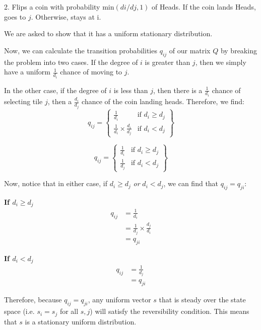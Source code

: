\documentclass{article}
\begin{document}
2. Flips a coin with probability $\text{min}(di/dj, 1)$ of Heads. If the coin lands Heads, goes to $j$. Otherwise, stays at i.

We are asked to show that it has a uniform stationary distribution. 

Now, we can calculate the transition probabilities $q_{ij}$ of our matrix $Q$ by breaking the problem into two cases. If the degree of $i$ is greater than $j$, then we simply have a uniform $\frac{1}{d_{i}}$ chance of moving to $j$.

In the other case, if the degree of $i$ is less than $j$, then there is a $\frac{1}{d_{i}}$ chance of selecting tile $j$, then a $\frac{d_{i}}{d_{j}}$ chance of the coin landing heads. Therefore, we find:
\begin{equation}
q_{ij} =
\left\{
    \begin{array}{lr}
        \frac{1}{d_{i}} & \text{if } d_{i} \geq d_{j}\\
        \frac{1}{d_{i}} \times \frac{d_{i}}{d_{j}} & \text{if } d_{i} < d_{j}
    \end{array}
\right\}
\end{equation}

\begin{equation}
q_{ij} =
\left\{
    \begin{array}{lr}
        \frac{1}{d_{i}} & \text{if } d_{i} \geq d_{j}\\
        \frac{1}{d_{j}} & \text{if } d_{i} < d_{j}
    \end{array}
\right\}
\end{equation}

Now, notice that in either case, if $d_{i} \geq d_{j}$ \textit{or} $d_{i} < d_{j}$, we can find that $q_{ij} = q_{ji}$:

\textbf{If $d_{i} \geq d_{j}$}
\begin{align}
q_{ij} &= \frac{1}{d_{i}} \\
& = \frac{1}{d_{j}} \times \frac{d_{j}}{d_{i}} \\
& = q_{ji}
\end{align}

\textbf{If $d_{i} < d_{j}$}
\begin{align}
q_{ij} &= \frac{1}{d_{j}} \\
& = q_{ji}
\end{align}

Therefore, because $q_{ij} = q_{ji}$, any uniform vector $s$ that is steady over the state space (i.e. $s_{i} = s_{j}$ for all $s, j$) will satisfy the reversibility condition. This means that $s$ is a stationary uniform distribution.
\end{document}
